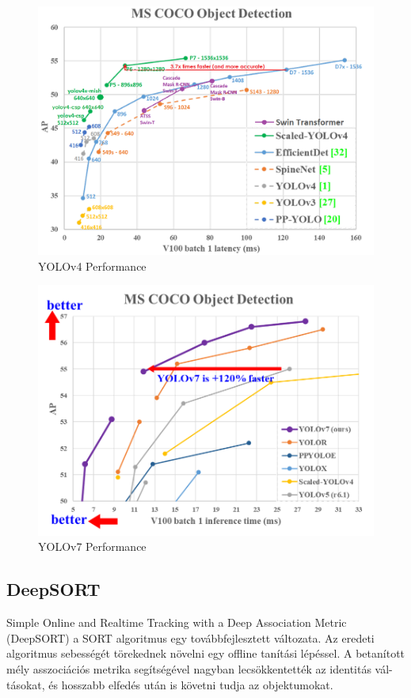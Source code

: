 \documentclass[acmtog, authorversion]{acmart}
\begin{document}
\begin{figure}[H]
 \includegraphics[width=1\columnwidth]{yolov4_perf.png}
 \caption[YOLOv4]{YOLOv4 Performance}
 \label{fig: Yolov4chart}
\end{figure}
\begin{figure}[H]
 \includegraphics[width=1\columnwidth]{performance.png}
 \caption[YOLOv7]{YOLOv7 Performance}
 \label{fig: Yolov7chart}
\end{figure}
\subsection{DeepSORT}
Simple Online and Realtime Tracking with a Deep Association Metric (DeepSORT) a SORT algoritmus egy továbbfejlesztett változata. Az eredeti
algoritmus sebességét törekednek növelni egy offline tanítási lépéssel. A betanított mély asszociációs metrika segítségével nagyban lecsökkentették
az identitás vál-tásokat, és hosszabb elfedés után is követni tudja az objektumokat.
\end{document}
